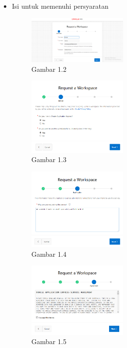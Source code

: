 \documentclass{article}
\begin{document}
\begin{itemize}
            \newpage
            \item Isi untuk memenuhi persyaratan
                \begin{figure}[ht]
                    \centerline{\includegraphics[width=5cm]{Capture2.PNG}}
                    \caption{Gambar 1.2}
                \end{figure}
                \begin{figure}[ht]
                    \centerline{\includegraphics[width=5cm]{Capture3.PNG}}
                    \caption{Gambar 1.3}
                \end{figure}
                \begin{figure}[ht]
                    \centerline{\includegraphics[width=5cm]{Capture4.PNG}}
                    \caption{Gambar 1.4}
                \end{figure}
                \begin{figure}[ht]
                    \centerline{\includegraphics[width=5cm]{Capture5.PNG}}
                    \caption{Gambar 1.5}

\end{figure}
\end{itemize}
\end{document}
